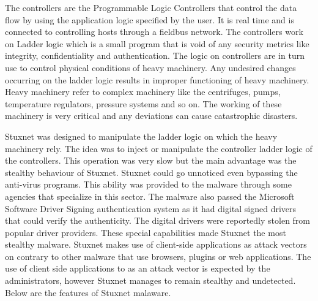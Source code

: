 \documentclass[article,msc=informatik,type=msc,colorback,accentcolor=tud9c]{tudthesis}
\begin{document}
	
	\vspace{3mm}
	 The controllers are the Programmable Logic Controllers that control the data flow by using the application logic specified by the user. It is real time and is connected to controlling hosts through a fieldbus network. The controllers work on Ladder logic which is a small program that is void of any security metrics like integrity, confidentiality and authentication. The logic on controllers are in turn use to control physical conditions of heavy machinery. Any undesired changes occurring on the ladder logic results in improper functioning of heavy machinery. Heavy machinery refer to complex machinery like the centrifuges, pumps, temperature regulators, pressure systems and so on. The working of these machinery is very critical and any deviations can cause catastrophic disasters.

	\vspace{3mm}
	Stuxnet was designed to manipulate the ladder logic on which the heavy machinery rely. The idea was to inject or manipulate the controller ladder logic of the controllers. This operation was very slow but the main advantage was the stealthy behaviour of Stuxnet. Stuxnet could go unnoticed even bypassing the anti-virus programs. This ability was provided to the malware through some agencies that specialize in this sector. The malware also passed the Microsoft Software Driver Signing authentication system as it had digital signed drivers that could verify the authenticity. The digital drivers were reportedly stolen from popular driver providers. These special capabilities made Stuxnet the most stealthy malware. Stuxnet makes use of client-side applications as attack vectors on contrary to other malware that use browsers, plugins or web applications. The use of client side applications to as an attack vector is expected by the administrators, however Stuxnet manages to remain stealthy and undetected. Below are the features of Stuxnet malaware.
\end{document}
